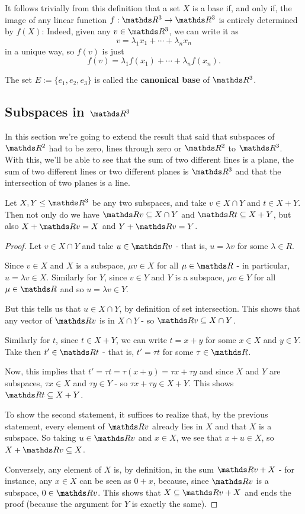 \begin{rmk}
	It follows trivially from this definition that a set $X$ is a base if, and only if, the image of any linear function $f:\R^3\to\R^3$ is entirely determined by $f(X)$: Indeed, given any $v\in \R^3$, we can write it as 
	\[v=\lambda_1x_1+\cdots+\lambda_nx_n\]in a unique way, so $f(v)$ is just
	\[f(v)=\lambda_1f(x_1)+\cdots+\lambda_nf(x_n).\]
\end{rmk}
\begin{df}
	The set $E:=\{e_1,e_2,e_3\}$ is called the \textbf{canonical base} of $\R^3$.
\end{df}

\newpage
\subsection{Subspaces in $\R^3$}

In this section we're going to extend the result that said that subspaces of $\R^2$ had to be zero, lines through zero or $\R^2$ to $\R^3$. With this, we'll be able to see that the sum of two different lines is a plane, the sum of two different lines or two different planes is $\R^3$ and that the intersection of two planes is a line.

\begin{lemma}
	Let $X,Y\leq \R^3$ be any two subspaces, and take $v\in X\cap Y$ and $t\in X+Y$. Then not only do we have $\R v\subseteq X\cap Y$ and $\R t\subseteq X+Y$, but also $X+\R v=X$ and $Y+\R v=Y$.
\end{lemma}
\begin{proof}
	Let $v\in X\cap Y$ and take $u\in \R v$ - that is, $u=\lambda v$ for some $\lambda\in R$.
	
	Since $v\in X$ and $X$ is a subspace, $\mu v\in X$ for all $\mu\in \R$ - in particular, $u=\lambda v\in X$. Similarly for $Y$, since $v\in Y$ and $Y$ is a subspace, $\mu v\in Y$ for all $\mu\in \R$ and so $u=\lambda v\in Y$.
	
	But this tells us that $u\in X\cap Y$, by definition of set intersection. This shows that any vector of $\R v$ is in $X\cap Y$ - so $\R v\subseteq X\cap Y$.
	
	\bigskip
	Similarly for $t$, since $t\in X+Y$, we can write $t=x+y$ for some $x\in X$ and $y\in Y$. Take then $t'\in \R t$ - that is, $t'=\tau t$ for some $\tau\in \R$.
	
	Now, this implies that $t'=\tau t=\tau(x+y)=\tau x+\tau y$ and since $X$ and $Y$ are subspaces, $\tau x\in X$ and $\tau y\in Y$ - so $\tau x+\tau y\in X+Y$. This shows $\R t\subseteq X+Y$.	
	
	\bigskip
	To show the second statement, it suffices to realize that, by the previous statement, every element of $\R v$ already lies in $X$ and that $X$ is a subspace. So taking $u\in \R v$ and $x\in X$, we see that $x+u\in X$, so $X+\R v\subseteq X$.
	
	Conversely, any element of $X$ is, by definition, in the sum $\R v+X$ - for instance, any $x\in X$ can be seen as $0+x$, because, since $\R v$ is a subspace, $0\in \R v$. This shows that $X\subseteq \R v+X$ and ends the proof (because the argument for $Y$ is exactly the same).
\end{proof}

